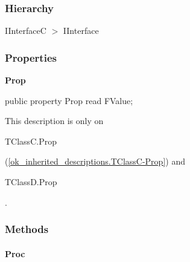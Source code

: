 \documentclass{report}
\newif\ifpdf
\begin{document}
\subsubsection*{\large{\textbf{Hierarchy}}\normalsize\hspace{1ex}\hfill}
IInterfaceC {$>$} IInterface
\subsubsection*{\large{\textbf{Properties}}\normalsize\hspace{1ex}\hfill}
\begin{list}{}{
\setlength{\itemindent}{0cm}
\setlength{\listparindent}{0cm}
\setlength{\leftmargin}{\evensidemargin}
\addtolength{\leftmargin}{\tmplength}
\settowidth{\labelsep}{X}
\addtolength{\leftmargin}{\labelsep}
\setlength{\labelwidth}{\tmplength}
}
\label{ok_inherited_descriptions.IInterfaceC-Prop}
\item[\textbf{Prop}\hfill]
\ifpdf
\begin{flushleft}
\fi
\begin{ttfamily}
public property Prop read FValue;\end{ttfamily}

\ifpdf
\end{flushleft}
\fi


\par This description is only on \begin{ttfamily}TClassC.Prop\end{ttfamily}(\ref{ok_inherited_descriptions.TClassC-Prop}) and \begin{ttfamily}TClassD.Prop\end{ttfamily}.\end{list}
\subsubsection*{\large{\textbf{Methods}}\normalsize\hspace{1ex}\hfill}
\paragraph*{Proc}\hspace*{\fill}
\end{document}
